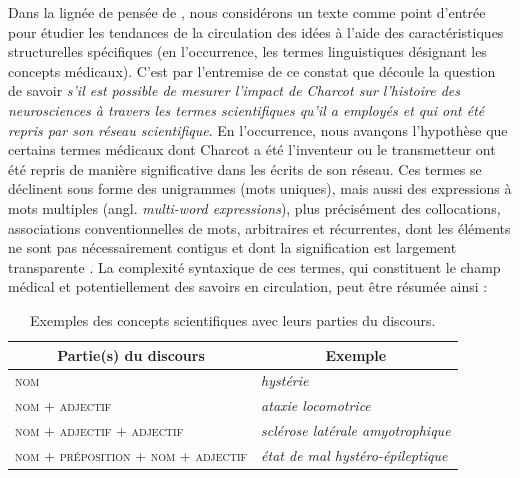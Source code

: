 Dans la lignée de pensée de \citet{milia2023}, nous considérons un texte comme point d'entrée pour étudier les tendances de la circulation des idées à l'aide des caractéristiques structurelles spécifiques (en l'occurrence, les termes linguistiques désignant les concepts médicaux). C'est par l'entremise de ce constat que découle la question de savoir \textit{s'il est possible de mesurer l'impact de Charcot sur l'histoire des neurosciences à travers les termes scientifiques qu'il a employés et qui ont été repris par son réseau scientifique}. En l'occurrence, nous avançons l'hypothèse que certains termes médicaux dont Charcot a été l'inventeur ou le transmetteur ont été repris de manière significative dans les écrits de son réseau. Ces termes se déclinent sous forme des unigrammes (mots uniques), mais aussi des expressions à mots multiples (angl. \textit{multi-word expressions}), plus précisément des collocations, \og{}associations conventionnelles de mots, arbitraires et récurrentes, dont les éléments ne sont pas nécessairement contigus et dont la signification est largement transparente\fg{} \citep[p. 96]{nerima2006}. La complexité syntaxique de ces termes, qui constituent le champ médical et potentiellement des savoirs en circulation, peut être résumée ainsi :
\begin{table}[h]
	\centering
	\begin{tabular}{l|l}
		\multicolumn{1}{c|}{Partie(s) du discours} & \multicolumn{1}{c}{Exemple} \\
		\hline
		\textsc{nom} & \textit{hystérie}\\
		\textsc{nom + adjectif} & \textit{ataxie locomotrice}\\
		\textsc{nom + adjectif + adjectif} & \textit{sclérose latérale amyotrophique}\\
		\textsc{nom + préposition + nom + adjectif} & \textit{état de mal hystéro-épileptique}
	\end{tabular}
	\caption{Exemples des concepts scientifiques avec leurs parties du discours.}
\end{table}

